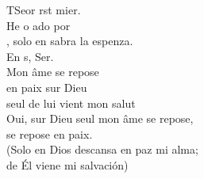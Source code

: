 \begin{cancion}%
	TSeor rst mier.\\
	He o ado por \\
	, solo en sabra la espenza. \\
	En s, Ser.\\
Mon âme se repose\\
en paix sur Dieu \\
seul de lui vient mon salut\\
Oui, sur Dieu seul mon âme se repose,\\
se repose en paix.\\
(Solo en Dios descansa en paz mi alma;\\
de Él viene mi salvación)\\
\end{cancion}%
